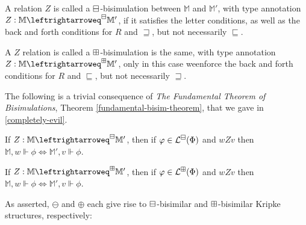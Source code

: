 \begin{mydef}
A relation $Z$ is called a $\boxminus$-bisimulation between $\mathbb{M}$ and
$\mathbb{M}'$, with type annotation $Z:\mathbb{M}\leftrightarroweq^\BM\mathbb{M}'$, if it satisfies the letter
conditions, as well as the back and forth conditions for $R$ and
$\sqsupseteq$, but not necessarily $\sqsubseteq$.

A $Z$ relation is called a $\boxplus$-bisimulation is the same, with type
annotation $Z:\mathbb{M}\leftrightarroweq^\BP\mathbb{M}'$, only in
this case weenforce the back and forth conditions for $R$ and
$\sqsubseteq$, but not necessarily $\sqsupseteq$.
\end{mydef}

The following is a trivial consequence of \emph{The Fundamental
  Theorem of Bisimulations}, Theorem \ref{fundamental-bisim-theorem},
that we gave in \ref{completely-evil}.

\begin{proposition}
If $Z:\mathbb{M}\leftrightarroweq^\BM\mathbb{M}'$, then if $\varphi \in
\mathcal{L}^\boxminus(\Phi)$ and $w Z v$ then $\mathbb{M},w \Vdash \phi \iff
\mathbb{M}',v \Vdash \phi$.

If $Z:\mathbb{M}\leftrightarroweq^\BP\mathbb{M}'$, then if $\varphi \in
\mathcal{L}^\boxplus(\Phi)$ and $w Z v$ then $\mathbb{M},w \Vdash \phi \iff \mathbb{M}',v \Vdash \phi$.
\end{proposition}

As asserted, $\ominus$ and $\oplus$ each give rise to
$\boxminus$-bisimilar and $\boxplus$-bisimilar Kripke structures, respectively:

